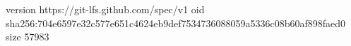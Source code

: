 version https://git-lfs.github.com/spec/v1
oid sha256:704e6597e32c577e651c4624eb9def7534736088059a5336c08b60af898faed0
size 57983
